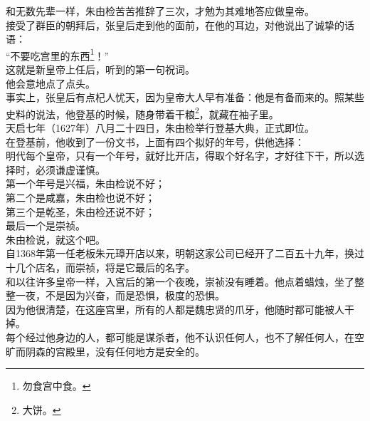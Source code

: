 \begin{multicols}{\theparacolNo}
和无数先辈一样，朱由检苦苦推辞了三次，才勉为其难地答应做皇帝。\\

接受了群臣的朝拜后，张皇后走到他的面前，在他的耳边，对他说出了诚挚的话语：\\

“不要吃宫里的东西\footnote{勿食宫中食。}！”\\

这就是新皇帝上任后，听到的第一句祝词。\\

他会意地点了点头。\\

事实上，张皇后有点杞人忧天，因为皇帝大人早有准备：他是有备而来的。照某些史料的说法，他登基的时候，随身带着干粮\footnote{大饼。}，就藏在袖子里。\\

天启七年（1627年）八月二十四日，朱由检举行登基大典，正式即位。\\

在登基前，他收到了一份文书，上面有四个拟好的年号，供他选择：\\

明代每个皇帝，只有一个年号，就好比开店，得取个好名字，才好往下干，所以选择时，必须谦虚谨慎。\\

第一个年号是兴福，朱由检说不好；\\

第二个是咸嘉，朱由检也说不好；\\

第三个是乾圣，朱由检还说不好；\\

最后一个是崇祯。\\

朱由检说，就这个吧。\\

自1368年第一任老板朱元璋开店以来，明朝这家公司已经开了二百五十九年，换过十几个店名，而崇祯，将是它最后的名字。\\

和以往许多皇帝一样，入宫后的第一个夜晚，崇祯没有睡着。他点着蜡烛，坐了整整一夜，不是因为兴奋，而是恐惧，极度的恐惧。\\

因为他很清楚，在这座宫里，所有的人都是魏忠贤的爪牙，他随时都可能被人干掉。\\

每个经过他身边的人，都可能是谋杀者，他不认识任何人，也不了解任何人，在空旷而阴森的宫殿里，没有任何地方是安全的。\\


\end{multicols}
